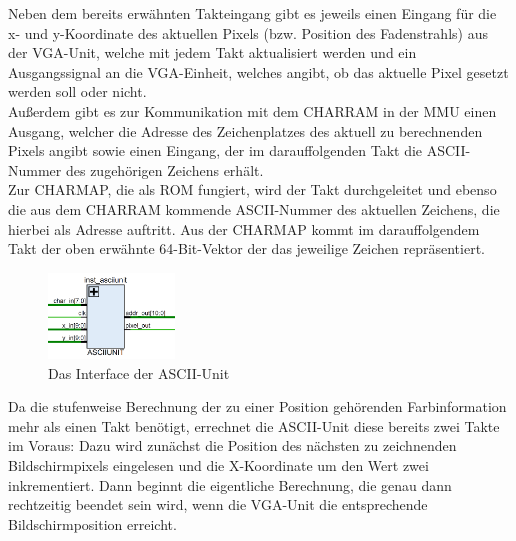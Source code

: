 Neben dem bereits erw\"ahnten Takteingang gibt es jeweils einen Eingang f\"ur die x- und y-Koordinate des aktuellen Pixels (bzw. Position des Fadenstrahls) aus der VGA-Unit, welche mit jedem Takt aktualisiert werden und ein Ausgangssignal an die VGA-Einheit, welches angibt, ob das aktuelle Pixel gesetzt werden soll oder nicht.\\ Au{\ss}erdem gibt es zur Kommunikation mit dem CHARRAM in der MMU einen Ausgang, welcher die Adresse des Zeichenplatzes des aktuell zu berechnenden Pixels angibt sowie einen Eingang, der im darauffolgenden Takt die ASCII-Nummer des zugeh\"origen Zeichens erh\"alt.\\
Zur CHARMAP, die als ROM fungiert, wird der Takt durchgeleitet und ebenso die aus dem CHARRAM kommende ASCII-Nummer des aktuellen Zeichens, die hierbei als Adresse auftritt. Aus der CHARMAP kommt im darauffolgendem Takt der oben erw\"ahnte 64-Bit-Vektor der das jeweilige Zeichen repr\"asentiert.

\begin{figure}[H]
	\centering
	\label{fig:interface}
		\includegraphics[width=0.3\textwidth]{Asciiunit.png}
	\caption[Interface der ASCII-Unit]{Das Interface der ASCII-Unit}
\end{figure}


Da die stufenweise Berechnung der zu einer Position geh\"orenden Farbinformation mehr als einen Takt ben\"otigt, errechnet die ASCII-Unit diese bereits zwei Takte im Voraus: Dazu wird zun\"achst die Position des n\"achsten zu zeichnenden Bildschirmpixels eingelesen und die X-Koordinate um den Wert zwei inkrementiert. Dann beginnt die eigentliche Berechnung, die genau dann rechtzeitig beendet sein wird, wenn die VGA-Unit die entsprechende Bildschirmposition erreicht.

